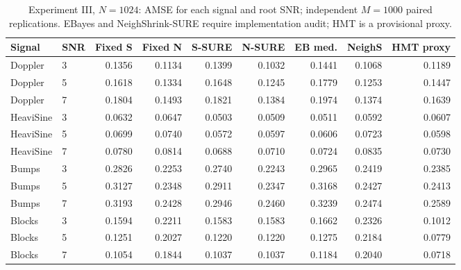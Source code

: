 \documentclass[11pt]{article}
\numberwithin{equation}{section}
\begin{document}
\begin{table}[H]
\centering\small
\caption{Experiment III, $N=1024$: AMSE for each signal and root SNR; independent $M=1000$ paired replications. EBayes and NeighShrink-SURE require implementation audit; HMT is a provisional proxy.}
\label{tab:s5-e3-amse-1024}
\setlength{\tabcolsep}{5pt}
\scriptsize
\setlength{\tabcolsep}{3pt}
\begin{tabular}{llrrrrrrr}
\toprule
Signal & SNR & Fixed S & Fixed N & S-SURE & N-SURE & EB med. & NeighS & HMT proxy \\
\midrule
Doppler & 3 & 0.1356 & 0.1134 & 0.1399 & 0.1032 & 0.1441 & 0.1068 & 0.1189 \\
Doppler & 5 & 0.1618 & 0.1334 & 0.1648 & 0.1245 & 0.1779 & 0.1253 & 0.1447 \\
Doppler & 7 & 0.1804 & 0.1493 & 0.1821 & 0.1384 & 0.1974 & 0.1374 & 0.1639 \\
HeaviSine & 3 & 0.0632 & 0.0647 & 0.0503 & 0.0509 & 0.0511 & 0.0592 & 0.0607 \\
HeaviSine & 5 & 0.0699 & 0.0740 & 0.0572 & 0.0597 & 0.0606 & 0.0723 & 0.0598 \\
HeaviSine & 7 & 0.0780 & 0.0814 & 0.0688 & 0.0710 & 0.0724 & 0.0835 & 0.0730 \\
Bumps & 3 & 0.2826 & 0.2253 & 0.2740 & 0.2243 & 0.2965 & 0.2419 & 0.2385 \\
Bumps & 5 & 0.3127 & 0.2348 & 0.2911 & 0.2347 & 0.3168 & 0.2427 & 0.2413 \\
Bumps & 7 & 0.3193 & 0.2428 & 0.2946 & 0.2460 & 0.3239 & 0.2474 & 0.2589 \\
Blocks & 3 & 0.1594 & 0.2211 & 0.1583 & 0.1583 & 0.1662 & 0.2326 & 0.1012 \\
Blocks & 5 & 0.1251 & 0.2027 & 0.1220 & 0.1220 & 0.1275 & 0.2184 & 0.0779 \\
Blocks & 7 & 0.1054 & 0.1844 & 0.1037 & 0.1037 & 0.1184 & 0.2040 & 0.0718 \\
\bottomrule
\end{tabular}
\end{table}
\end{document}
